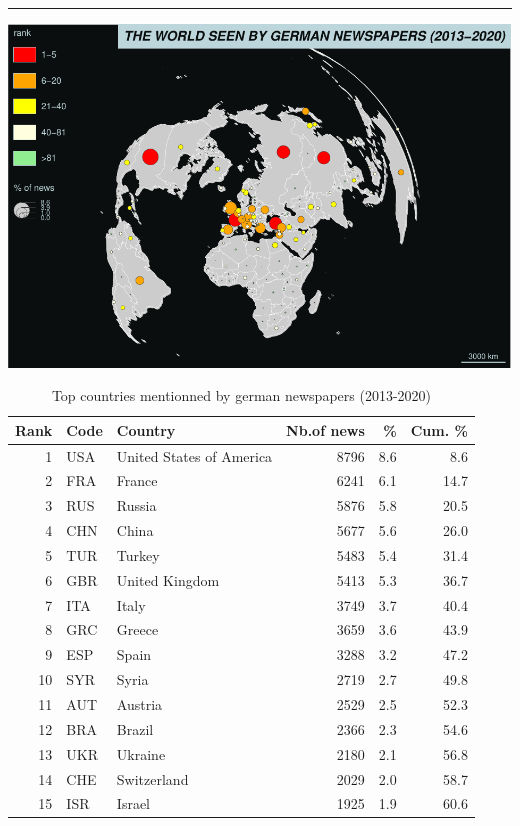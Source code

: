\documentclass[
]{article}
\begin{document}
\begin{center}\rule{0.5\linewidth}{0.5pt}\end{center}

\includegraphics{Part2_maps_files/figure-latex/unnamed-chunk-7-1.pdf}

\begin{table}

\caption{\label{tab:unnamed-chunk-8}Top countries mentionned by german newspapers (2013-2020)}
\centering
\begin{tabular}[t]{r|l|l|r|r|r}
\hline
Rank & Code & Country & Nb.of news & \% & Cum. \%\\
\hline
1 & USA & United States of America & 8796 & 8.6 & 8.6\\
\hline
2 & FRA & France & 6241 & 6.1 & 14.7\\
\hline
3 & RUS & Russia & 5876 & 5.8 & 20.5\\
\hline
4 & CHN & China & 5677 & 5.6 & 26.0\\
\hline
5 & TUR & Turkey & 5483 & 5.4 & 31.4\\
\hline
6 & GBR & United Kingdom & 5413 & 5.3 & 36.7\\
\hline
7 & ITA & Italy & 3749 & 3.7 & 40.4\\
\hline
8 & GRC & Greece & 3659 & 3.6 & 43.9\\
\hline
9 & ESP & Spain & 3288 & 3.2 & 47.2\\
\hline
10 & SYR & Syria & 2719 & 2.7 & 49.8\\
\hline
11 & AUT & Austria & 2529 & 2.5 & 52.3\\
\hline
12 & BRA & Brazil & 2366 & 2.3 & 54.6\\
\hline
13 & UKR & Ukraine & 2180 & 2.1 & 56.8\\
\hline
14 & CHE & Switzerland & 2029 & 2.0 & 58.7\\
\hline
15 & ISR & Israel & 1925 & 1.9 & 60.6\\
\hline
\end{tabular}
\end{table}
\end{document}
